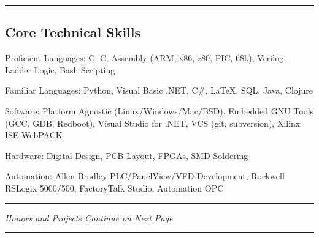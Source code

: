 \documentclass[10pt,letterpaper]{article}
\newenvironment{indentsection}[1]%
{\begin{list}{}%
	{\setlength{\leftmargin}{#1}}%
	\item[]%
}
{\end{list}}
\newcommand{\CPP}
{C\nolinebreak[4]\hspace{-.05em}\raisebox{.22ex}{\footnotesize\bf ++}}
\begin{document}
\hrule
\vspace{-0.4em}
\subsection*{Core Technical Skills}

\begin{indentsection}{\parindent}
\begin{description*}
	\item[Proficient Languages:]
    C, \CPP, Assembly (ARM, x86, z80, PIC, 68k), Verilog, Ladder Logic, Bash Scripting 
	\item[Familiar Languages:]
    Python, Visual Basic .NET, C\#, \LaTeX, SQL, Java, Clojure 
	\item[Software:]
    Platform Agnostic (Linux/Windows/Mac/BSD), Embedded GNU Tools (GCC, GDB, Redboot), Visual Studio for .NET, VCS (git, subversion), Xilinx ISE WebPACK
	\item[Hardware:]
    Digital Design, PCB Layout, FPGAs, SMD Soldering 
	\item[Automation:]
    Allen-Bradley PLC/PanelView/VFD Development, Rockwell RSLogix 5000/500, FactoryTalk Studio, Automation OPC 	
\end{description*}
\end{indentsection}
\vspace{1em}

\hrule
\begin{center}
{\emph{Honors and Projects Continue on Next Page}}

\end{center}

\newpage
\hrule
\vspace{-0.4em}
\end{document}
